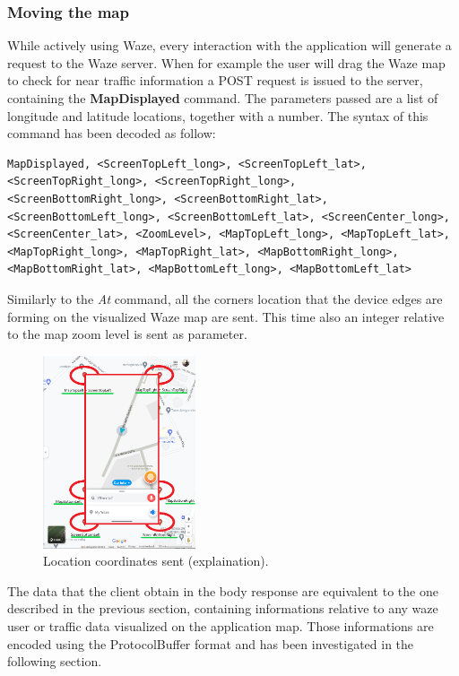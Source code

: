 		\subsubsection{Moving the map}
			\par While actively using Waze, every interaction with the application will generate a request to the Waze server. When for example the user will drag the Waze map to check for near traffic information a POST request is issued to the server, containing the \textbf{MapDisplayed} command. The parameters passed are a list of longitude and latitude locations, together with a number. The syntax of this command has been decoded as follow:
			\begin{lstlisting}
MapDisplayed, <ScreenTopLeft_long>, <ScreenTopLeft_lat>, <ScreenTopRight_long>, <ScreenTopRight_long>, <ScreenBottomRight_long>, <ScreenBottomRight_lat>, <ScreenBottomLeft_long>, <ScreenBottomLeft_lat>, <ScreenCenter_long>, <ScreenCenter_lat>, <ZoomLevel>, <MapTopLeft_long>, <MapTopLeft_lat>, <MapTopRight_long>, <MapTopRight_lat>, <MapBottomRight_long>, <MapBottomRight_lat>, <MapBottomLeft_long>, <MapBottomLeft_lat>
			\end{lstlisting}
			Similarly to the \textit{At} command, all the corners location that the device edges are forming on the visualized Waze map are sent. This time also an integer relative to the map zoom level is sent as parameter. \newline
			\begin{figure}[H]
				\centering
				\includegraphics[width=0.4\textwidth]{images/waze_MapDisplayed_coord_combined.png}
				\caption{Location coordinates sent (explaination).}
			\end{figure}
			The data that the client obtain in the body response are equivalent to the one described in the previous section, containing informations relative to any waze user or traffic data visualized on the application map. Those informations are encoded using the ProtocolBuffer format and has been investigated in the following section.
			
